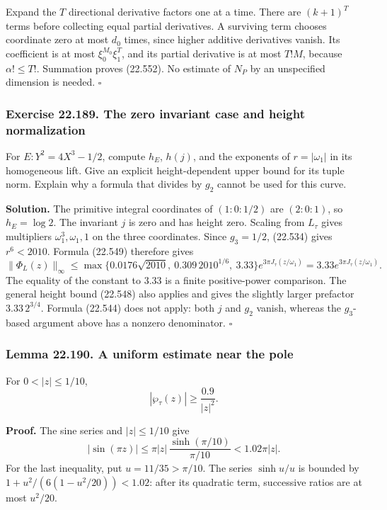 \documentclass[
  11pt,
  a4paper,
]{article}
\begin{document}
Expand the \(T\) directional derivative factors one at a time. There are
\((k+1)^T\) terms before collecting equal partial derivatives. A
surviving term chooses coordinate zero at most \(d_0\) times, since
higher additive derivatives vanish. Its coefficient is at most
\(\xi_0^{M_0}\xi_1^T\), and its partial derivative is at most \(T!M\),
because \(\alpha!\le T!\). Summation proves (22.552). No estimate of
\(N_P\) by an unspecified dimension is needed. \(\square\)

\subsubsection{Exercise 22.189. The zero invariant case and height
normalization}\label{exercise-22.189.-the-zero-invariant-case-and-height-normalization}

For \(E:Y^2=4X^3-1/2\), compute \(h_E\), \(h(j)\), and the exponents of
\(r=|\omega_1|\) in its homogeneous lift. Give an explicit
height-dependent upper bound for its tuple norm. Explain why a formula
that divides by \(g_2\) cannot be used for this curve.

\textbf{Solution.} The primitive integral coordinates of \((1:0:1/2)\)
are \((2:0:1)\), so \(h_E=\log2\). The invariant \(j\) is zero and has
height zero. Scaling from \(L_\tau\) gives multipliers
\(\omega_1^3,\omega_1,1\) on the three coordinates. Since \(g_3=1/2\),
(22.534) gives \(r^6<2010\). Formula (22.549) therefore gives \[
 \|\Phi_L(z)\|_\infty
 \le\max\{0.0176\sqrt{2010},\ 0.309\,2010^{1/6},\ 3.33\}
          e^{3\pi J_\tau(z/\omega_1)}
 =3.33e^{3\pi J_\tau(z/\omega_1)}.
 \tag{22.553}
\] The equality of the constant to \(3.33\) is a finite positive-power
comparison. The general height bound (22.548) also applies and gives the
slightly larger prefactor \(3.33\,2^{3/4}\). Formula (22.544) does not
apply: both \(j\) and \(g_2\) vanish, whereas the \(g_3\)-based argument
above has a nonzero denominator. \(\square\)

\subsubsection{Lemma 22.190. A uniform estimate near the
pole}\label{lemma-22.190.-a-uniform-estimate-near-the-pole}

For \(0<|z|\le1/10\), \[
 |\wp_\tau(z)|\ge\frac{0.9}{|z|^2}.
 \tag{22.554}
\]

\textbf{Proof.} The sine series and \(|z|\le1/10\) give \[
 |\sin(\pi z)|\le\pi|z|\,
 \frac{\sinh(\pi/10)}{\pi/10}<1.02\pi|z|.
 \tag{22.555}
\] For the last inequality, put \(u=11/35>\pi/10\). The series
\(\sinh u/u\) is bounded by \(1+u^2/(6(1-u^2/20))<1.02\): after its
quadratic term, successive ratios are at most \(u^2/20\).
\end{document}
